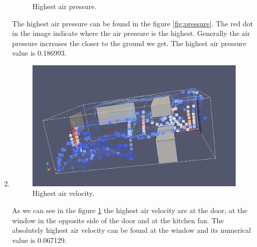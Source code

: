 \documentclass[a4paper]{article}
\begin{document}
\begin{enumerate}
\begin{figure}
            \caption{Highest air pressure.}
        \end{figure}
        The highest air pressure can be found in the figure \ref{fig:pressure}. The red dot
        in the image indicate where the air pressure is the highest. Generally
        the air pressure increases the closer to the ground we get. The highest
        air pressure value is 0.186993.
    \item
        \begin{figure}
            \label{fig:velocity}
            \includegraphics[width=1\linewidth]{lab5/kitchen-largest-air-velocity-screenshot.png}
            \caption{Highest air velocity.}
        \end{figure}
        As we can see in the figure \ref{fig:velocity} the highest air velocity are at the
        door, at the window in the opposite side of the door and at the kitchen
        fan. The absolutely highest air velocity can be found at the window and
        its numerical value is 0.067129.
\end{enumerate}
\end{document}
